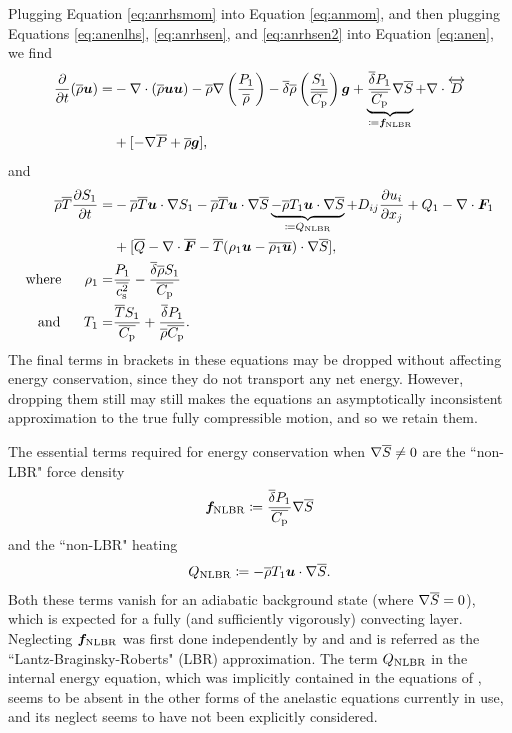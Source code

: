 \documentclass[12pt]{article}
\newcommand{\vecf}{\bm{F}}
\newcommand{\deltaref}{\overline{\delta}}
\newcommand{\cpref}{\overline{\cpcap}}
\newcommand{\cssqref}{\overline{\cs^2}}
\begin{document}
Plugging Equation \eqref{eq:anrhsmom} into Equation \eqref{eq:anmom}, and then plugging Equations \eqref{eq:anenlhs}, \eqref{eq:anrhsen}, and \eqref{eq:anrhsen2} into Equation \eqref{eq:anen}, we find
	\begin{align}\label{eq:anmommod}
		\pderiv{}{t}(\rhoref\vecu)= &-\Div(\rhoref\vecu\vecu) -\rhoref\nabla\left(\frac{P_1}{\rhoref}\right) - \deltaref \rhoref \left(\frac{S_1}{\cpref}\right) \vecg + \underbrace{\frac{\deltaref P_1}{\cpref} \nabla\sref}_{\define \bm{f}_{\rm NLBR}}+\Div \overleftrightarrow{D}\nonumber\\
		&+[-\nabla\prsref + \rhoref\vecg],
	\end{align}
and
\begin{subequations}\label{eq:anenmod}
\begin{align}
	\rhoref\tmpref\pderiv{S_1}{t}= &-\rhoref\tmpref\ugrad S_1 - \rhoref \tmpref \ugrad \sref \underbrace{- \rhoref T_1\ugrad\sref}_{\define Q_{\rm NLBR}}+D_{ij}\pderiv{u_i}{x_j} + Q _1- \Div\vecf_1  \nonumber\\
	& +[\qref - \Div\overline{\vecf} - \tmpref(\rho_1\vecu-\overline{\rho_1\vecu})\cdot\nabla\sref],\\
	\where \rho_1 =& \frac{P_1}{\cssqref}-\frac{\deltaref\rhoref S_1}{\cpref}\\
	\andd T_1 = & \frac{\tmpref S_1}{\cpref} + \frac{\deltaref P_1}{\rhoref\cpref}.
\end{align}
\end{subequations}
The final terms in brackets in these equations may be dropped without affecting energy conservation, since they do not transport any net energy. However, dropping them still may still makes the equations an asymptotically inconsistent approximation to the true fully compressible motion, and so we retain them.

The essential terms required for energy conservation when $\nabla\overline{S}\neq0$ are the ``non-LBR" force density
\begin{align}\label{eq:nlbrmom}
	\bm{f}_{\rm NLBR} \define \frac{\deltaref P_1}{\cpref} \nabla\sref
\end{align}
and the ``non-LBR" heating
\begin{align}\label{eq:nlbrheat}
	Q_{\rm NLBR} \coloneqq -\overline{\rho} T_1\bm{u}\cdot\nabla\overline{S}.
\end{align}
Both these terms vanish for an adiabatic background state (where $\nabla\overline{S}=0$), which is expected for a fully (and sufficiently vigorously) convecting layer.  Neglecting $\bm{f}_{\rm NLBR}$ was first done independently by \citet{Lantz1992} and \citet{Braginsky1995} and is referred as the ``Lantz-Braginsky-Roberts" (LBR) approximation. The term $Q_{\rm NLBR}$ in the internal energy equation, which was implicitly contained in the equations of \citet{Gough1969}, seems to be absent in the other forms of the anelastic equations currently in use, and its neglect seems to have not been explicitly considered. 
\end{document}
